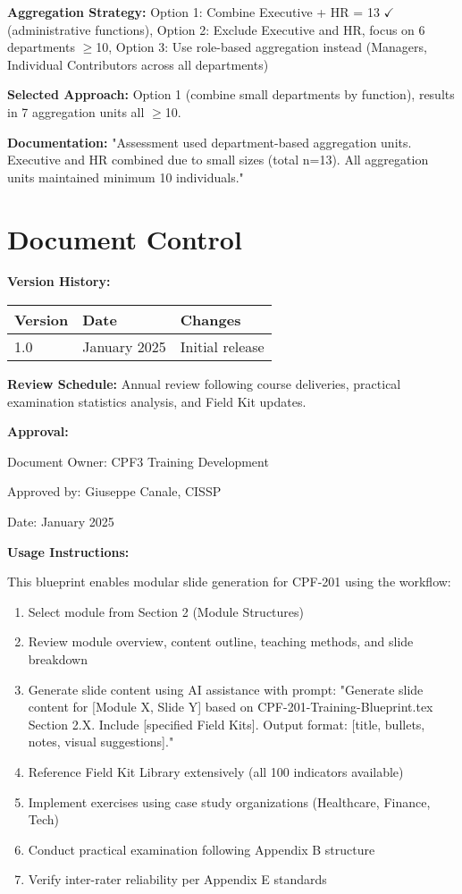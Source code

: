 \documentclass[11pt,a4paper]{article}
\begin{document}
\textbf{Aggregation Strategy:} Option 1: Combine Executive + HR = 13 $\checkmark$ (administrative functions), Option 2: Exclude Executive and HR, focus on 6 departments $\ge$10, Option 3: Use role-based aggregation instead (Managers, Individual Contributors across all departments)

\textbf{Selected Approach:} Option 1 (combine small departments by function), results in 7 aggregation units all $\ge$10.

\textbf{Documentation:} "Assessment used department-based aggregation units. Executive and HR combined due to small sizes (total n=13). All aggregation units maintained minimum 10 individuals."

\section*{Document Control}

\textbf{Version History:}

\begin{tabular}{llp{8cm}}
\toprule
Version & Date & Changes \\
\midrule
1.0 & January 2025 & Initial release \\
\bottomrule
\end{tabular}

\vspace{1em}

\textbf{Review Schedule:} Annual review following course deliveries, practical examination statistics analysis, and Field Kit updates.

\textbf{Approval:}

Document Owner: CPF3 Training Development

Approved by: Giuseppe Canale, CISSP

Date: January 2025

\textbf{Usage Instructions:}

This blueprint enables modular slide generation for CPF-201 using the workflow:

\begin{enumerate}
\item Select module from Section 2 (Module Structures)
\item Review module overview, content outline, teaching methods, and slide breakdown
\item Generate slide content using AI assistance with prompt: "Generate slide content for [Module X, Slide Y] based on CPF-201-Training-Blueprint.tex Section 2.X. Include [specified Field Kits]. Output format: [title, bullets, notes, visual suggestions]."
\item Reference Field Kit Library extensively (all 100 indicators available)
\item Implement exercises using case study organizations (Healthcare, Finance, Tech)
\item Conduct practical examination following Appendix B structure
\item Verify inter-rater reliability per Appendix E standards
\end{enumerate}
\end{document}
